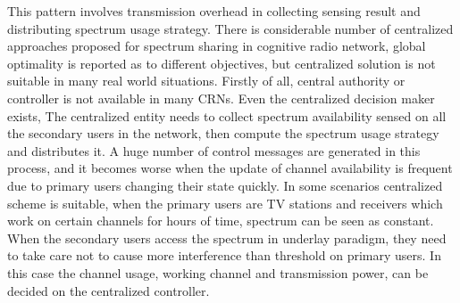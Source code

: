 This pattern involves transmission overhead in collecting sensing result and distributing spectrum usage strategy.
There is considerable number of centralized approaches proposed for spectrum sharing in cognitive radio network, global optimality is reported as to different objectives, but centralized solution is not suitable in many real world situations.
Firstly of all, central authority or controller is not available in many CRNs.
Even the centralized decision maker exists, The centralized entity needs to collect spectrum availability sensed on all the secondary users in the network, then compute the spectrum usage strategy and distributes it.
A huge number of control messages are generated in this process, and it becomes worse when the update of channel availability is frequent due to primary users changing their state quickly.
In some scenarios centralized scheme is suitable, \eg when the primary users are TV stations and receivers which work on certain channels for hours of time, spectrum can be seen as constant. 
When the secondary users access the spectrum in underlay paradigm, they need to take care not to cause more interference than threshold on primary users.
In this case the channel usage, \ie working channel and transmission power, can be decided on the centralized controller.


